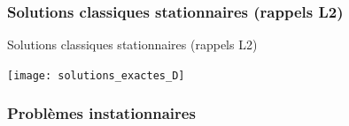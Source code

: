 
\subsubsection{Solutions classiques stationnaires (rappels L2)}

\begin{frame}{Solutions classiques stationnaires (rappels L2)}

\begin{center}
			\texttt{[image: solutions\_exactes\_D]}
\end{center}



\end{frame}


\subsubsection{Problèmes instationnaires}






